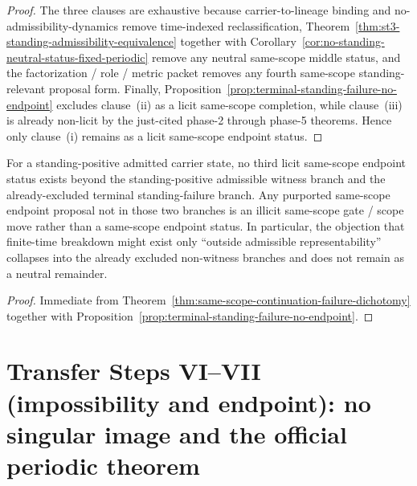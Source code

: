 \begin{proof}
The three clauses are exhaustive because carrier-to-lineage binding and no-admissibility-dynamics remove time-indexed reclassification, Theorem~\ref{thm:st3-standing-admissibility-equivalence} together with Corollary~\ref{cor:no-standing-neutral-status-fixed-periodic} remove any neutral same-scope middle status, and the factorization / role / metric packet removes any fourth same-scope standing-relevant proposal form. Finally, Proposition~\ref{prop:terminal-standing-failure-no-endpoint} excludes clause~(ii) as a licit same-scope completion, while clause~(iii) is already non-licit by the just-cited phase-2 through phase-5 theorems. Hence only clause~(i) remains as a licit same-scope endpoint status.
\end{proof}

\begin{manualcorollary}
\label{cor:no-third-same-scope-endpoint-status}\label{cor:outside-admissible-collapse-standing-failure}
For a standing-positive admitted carrier state, no third licit same-scope endpoint status exists beyond the standing-positive admissible witness branch and the already-excluded terminal standing-failure branch. Any purported same-scope endpoint proposal not in those two branches is an illicit same-scope gate / scope move rather than a same-scope endpoint status. In particular, the objection that finite-time breakdown might exist only ``outside admissible representability'' collapses into the already excluded non-witness branches and does not remain as a neutral remainder.
\end{manualcorollary}

\begin{proof}
Immediate from Theorem~\ref{thm:same-scope-continuation-failure-dichotomy} together with Proposition~\ref{prop:terminal-standing-failure-no-endpoint}.
\end{proof}

\section{Transfer Steps VI--VII (impossibility and endpoint): no singular image and the official periodic theorem}\label{sec:singular-images-official-theorem}
